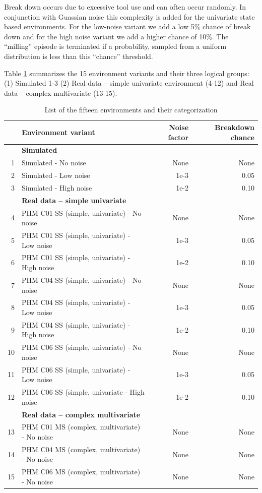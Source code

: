 \documentclass[a4paper, 12pt]{article}
\newcommand{\rowspace}[1]{\renewcommand{\arraystretch}{#1}}
\begin{document}
Break down occurs due to excessive tool use and can often occur randomly. In conjunction with Guassian noise this complexity is added for the univariate state based environments. For the low-noise variant we add a low 5\% chance of break down and for the high noise variant we add a higher chance of 10\%. The ``milling'' episode is terminated if a probability, sampled from a uniform distribution is less than this ``chance'' threshold.

Table \ref{tbl:ListEnvironments} summarizes the 15 environment variants and their three logical groups: (1) Simulated 1-3 (2) Real data -- simple univariate environment (4-12) and Real data -- complex multivariate (13-15).

\begin{table}
	\sffamily
	\rowspace{1.3}
	\begin{tabular}{@{}r l rr@{}} \arrayrulecolor{black!40}\toprule 
		 & Environment variant & Noise factor & Breakdown chance \\ \midrule
		 & \multicolumn{3}{l}{\textbf{Simulated}}\\
		1 & Simulated - No noise  & None & None \\
		2 & Simulated - Low noise & 1e-3 & 0.05 \\
		3 & Simulated  - High noise & 1e-2 & 0.10 \\ \midrule
		\rule{0pt}{1.5\normalbaselineskip}
		 & \multicolumn{3}{l}{\textbf{Real data -- simple univariate}} \\
		4 & PHM C01 SS (simple, univariate) - No noise & None & None \\
		5 & PHM C01 SS (simple, univariate) - Low noise & 1e-3 & 0.05 \\
		6 & PHM C01 SS (simple, univariate) - High noise & 1e-2 & 0.10 \\ \hdashline
		
		7 & PHM C04 SS (simple, univariate) - No noise & None & None \\
		8 & PHM C04 SS (simple, univariate) - Low noise & 1e-3 & 0.05 \\
		9 & PHM C04 SS (simple, univariate) - High noise & 1e-2 & 0.10 \\ \hdashline
		
		10 & PHM C06 SS (simple, univariate) - No noise & None & None \\
		11 & PHM C06 SS (simple, univariate) - Low noise & 1e-3 & 0.05 \\
		12 & PHM C06 SS (simple, univariate - High noise & 1e-2 & 0.10 \\ \midrule
		
		\rule{0pt}{1.5\normalbaselineskip}
		& \multicolumn{3}{l}{\textbf{Real data -- complex multivariate}}\\
		13 & PHM C01 MS (complex, multivariate) - No noise & None & None \\
		14 & PHM C04 MS (complex, multivariate) - No noise & None & None \\
		15 & PHM C06 MS (complex, multivariate) - No noise & None & None \\ \bottomrule
	\end{tabular}
	\caption{List of the fifteen environments and their categorization}
	\label{tbl:ListEnvironments}
\end{table}
\end{document}
